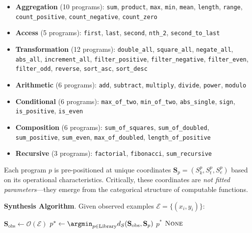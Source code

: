 \documentclass[twocolumn,10pt]{article}
\begin{document}
\begin{itemize}
\item \textbf{Aggregation} (10 programs): \texttt{sum}, \texttt{product}, \texttt{max}, \texttt{min}, \texttt{mean}, \texttt{length}, \texttt{range}, \texttt{count\_positive}, \texttt{count\_negative}, \texttt{count\_zero}

\item \textbf{Access} (5 programs): \texttt{first}, \texttt{last}, \texttt{second}, \texttt{nth\_2}, \texttt{second\_to\_last}

\item \textbf{Transformation} (12 programs): \texttt{double\_all}, \texttt{square\_all}, \texttt{negate\_all}, \texttt{abs\_all}, \texttt{increment\_all}, \texttt{filter\_positive}, \texttt{filter\_negative}, \texttt{filter\_even}, \texttt{filter\_odd}, \texttt{reverse}, \texttt{sort\_asc}, \texttt{sort\_desc}

\item \textbf{Arithmetic} (6 programs): \texttt{add}, \texttt{subtract}, \texttt{multiply}, \texttt{divide}, \texttt{power}, \texttt{modulo}

\item \textbf{Conditional} (6 programs): \texttt{max\_of\_two}, \texttt{min\_of\_two}, \texttt{abs\_single}, \texttt{sign}, \texttt{is\_positive}, \texttt{is\_even}

\item \textbf{Composition} (6 programs): \texttt{sum\_of\_squares}, \texttt{sum\_of\_doubled}, \texttt{sum\_positive}, \texttt{sum\_even}, \texttt{max\_of\_doubled}, \texttt{length\_of\_positive}

\item \textbf{Recursive} (3 programs): \texttt{factorial}, \texttt{fibonacci}, \texttt{sum\_recursive}
\end{itemize}

Each program $p$ is pre-positioned at unique coordinates $\mathbf{S}_p = (S_k^p, S_t^p, S_e^p)$ based on its operational characteristics. Critically, these coordinates are \emph{not fitted parameters}—they emerge from the categorical structure of computable functions.

\textbf{Synthesis Algorithm}. Given observed examples $\mathcal{E} = \{(x_i, y_i)\}$:

\begin{algorithmic}[1]
\State $\mathbf{S}_{\text{obs}} \gets \mathcal{O}(\mathcal{E})$ 
\State $p^* \gets \argmin_{p \in \text{Library}} d_S(\mathbf{S}_{\text{obs}}, \mathbf{S}_p)$ 
 
    \State \Return $p^*$ 
\Else
    \State \Return $\textsc{None}$ 
\EndIf
\end{algorithmic}
\end{document}
